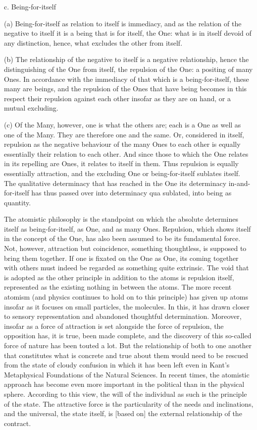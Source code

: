 c. Being-for-itself

(a) Being-for-itself as relation to itself is immediacy,
and as the relation of the negative to itself
it is a being that is for itself, the One:
what is in itself devoid of any distinction,
hence, what excludes the other from itself.

(b) The relationship of the negative to itself
is a negative relationship,
hence the distinguishing of the One from itself,
the repulsion of the One:
a positing of many Ones.
In accordance with the immediacy of
that which is a being-for-itself,
these many are beings,
and the repulsion of the Ones that have being
becomes in this respect their repulsion against each other
insofar as they are on hand, or a mutual excluding.

(c) Of the Many, however, one is what the others are;
each is a One as well as one of the Many.
They are therefore one and the same.
Or, considered in itself, repulsion as
the negative behaviour of the many Ones
to each other is equally essentially
their relation to each other.
And since those to which the One relates
in its repelling are Ones,
it relates to itself in them.
Thus repulsion is equally essentially attraction, and
the excluding One or being-for-itself sublates itself.
The qualitative determinacy that has reached in the One
its determinacy in-and-for-itself
has thus passed over into determinacy qua sublated,
into being as quantity.

The atomistic philosophy is the standpoint on which the absolute
determines itself as being-for-itself, as One, and as many Ones.
Repulsion, which shows itself in the concept of the One, has also
been assumed to be its fundamental force.
Not, however, attraction but coincidence, something thoughtless, is
supposed to bring them together.
If one is fixated on the One as One,
its coming together with others must
indeed be regarded as something quite extrinsic.
The void that is adopted as the other principle
in addition to the atoms is repulsion itself,
represented as the existing nothing in between the atoms.
The more recent atomism (and physics continues to hold on to this principle)
has given up atoms insofar as it focuses on small particles, the molecules.
In this, it has drawn closer to sensory representation and
abandoned thoughtful determination.
Moreover, insofar as a force of attraction is set alongside
the force of repulsion, the opposition has, it is true,
been made complete, and the discovery of this so-called
force of nature has been touted a lot.
But the relationship of both to one another that
constitutes what is concrete and true about them would need to be
rescued from the state of cloudy confusion in which it has been left
even in Kant's Metaphysical Foundations of the Natural Sciences.
In recent times, the atomistic approach has become even more important
in the political than in the physical sphere.
According to this view, the will of the individual as such is
the principle of the state.
The attractive force is the particularity of the needs and inclinations,
and the universal, the state itself, is [based on]
the external relationship of the contract.


